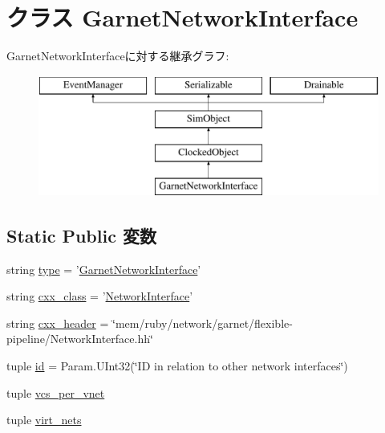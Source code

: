 \hypertarget{classGarnetNetwork_1_1GarnetNetworkInterface}{
\section{クラス GarnetNetworkInterface}
\label{classGarnetNetwork_1_1GarnetNetworkInterface}
}
GarnetNetworkInterfaceに対する継承グラフ:\begin{figure}[H]
\begin{center}
\leavevmode
\includegraphics[height=4cm]{classGarnetNetwork_1_1GarnetNetworkInterface}
\end{center}
\end{figure}
\subsection*{Static Public 変数}
\begin{DoxyCompactItemize}
\item 
string \hyperlink{classGarnetNetwork_1_1GarnetNetworkInterface_acce15679d830831b0bbe8ebc2a60b2ca}{type} = '\hyperlink{classGarnetNetwork_1_1GarnetNetworkInterface}{GarnetNetworkInterface}'
\item 
string \hyperlink{classGarnetNetwork_1_1GarnetNetworkInterface_a58cd55cd4023648e138237cfc0822ae3}{cxx\_\-class} = '\hyperlink{classNetworkInterface}{NetworkInterface}'
\item 
string \hyperlink{classGarnetNetwork_1_1GarnetNetworkInterface_a17da7064bc5c518791f0c891eff05fda}{cxx\_\-header} = \char`\"{}mem/ruby/network/garnet/flexible-\/pipeline/NetworkInterface.hh\char`\"{}
\item 
tuple \hyperlink{classGarnetNetwork_1_1GarnetNetworkInterface_a0e43f6071072440917ee2dd8af07d251}{id} = Param.UInt32(\char`\"{}ID in relation to other network interfaces\char`\"{})
\item 
tuple \hyperlink{classGarnetNetwork_1_1GarnetNetworkInterface_a2bb2221cda9b94b6a0c2944d8a12f31e}{vcs\_\-per\_\-vnet}
\item 
tuple \hyperlink{classGarnetNetwork_1_1GarnetNetworkInterface_a84c7a415611bc1b55aa5e7fd9e9601e8}{virt\_\-nets}
\end{DoxyCompactItemize}


